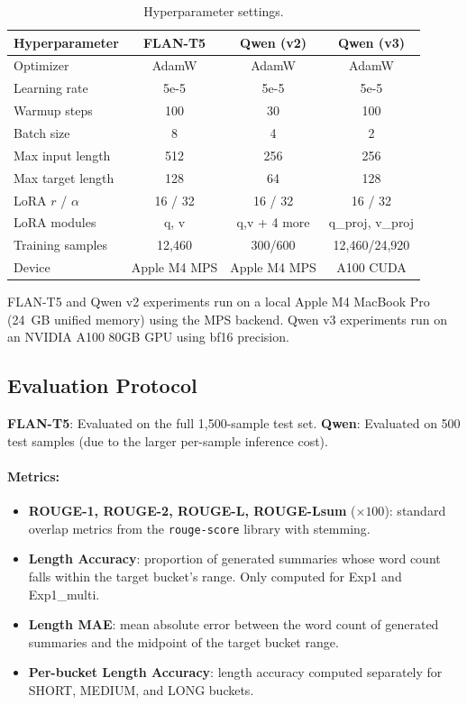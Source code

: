 \documentclass[11pt,a4paper]{article}
\begin{document}
\begin{table}[t]
\centering
\caption{Hyperparameter settings.}
\label{tab:hyperparams}
\small
\begin{tabular}{@{}lccc@{}}
\toprule
\textbf{Hyperparameter} & \textbf{FLAN-T5} & \textbf{Qwen (v2)} & \textbf{Qwen (v3)} \\
\midrule
Optimizer        & AdamW & AdamW & AdamW \\
Learning rate    & 5e-5  & 5e-5  & 5e-5  \\
Warmup steps     & 100   & 30    & 100   \\
Batch size       & 8     & 4     & 2     \\
Max input length & 512   & 256   & 256   \\
Max target length& 128   & 64    & 128   \\
LoRA $r$ / $\alpha$ & 16 / 32 & 16 / 32 & 16 / 32 \\
LoRA modules     & q, v  & q,v + 4 more & q\_proj, v\_proj \\
Training samples & 12,460 & 300/600 & 12,460/24,920 \\
Device           & Apple M4 MPS & Apple M4 MPS & A100 CUDA \\
\bottomrule
\end{tabular}
\end{table}

FLAN-T5 and Qwen v2 experiments run on a local Apple M4 MacBook Pro (24~GB unified memory) using the MPS backend.
Qwen v3 experiments run on an NVIDIA A100 80GB GPU using bf16 precision.

\subsection{Evaluation Protocol}

\textbf{FLAN-T5}: Evaluated on the full 1,500-sample test set.
\textbf{Qwen}: Evaluated on 500 test samples (due to the larger per-sample inference cost).

\paragraph{Metrics:}
\begin{itemize}[nosep]
  \item \textbf{ROUGE-1, ROUGE-2, ROUGE-L, ROUGE-Lsum} ($\times 100$): standard overlap metrics from the \texttt{rouge-score} library with stemming.
  \item \textbf{Length Accuracy}: proportion of generated summaries whose word count falls within the target bucket's range. Only computed for Exp1 and Exp1\_multi.
  \item \textbf{Length MAE}: mean absolute error between the word count of generated summaries and the midpoint of the target bucket range.
  \item \textbf{Per-bucket Length Accuracy}: length accuracy computed separately for SHORT, MEDIUM, and LONG buckets.
\end{itemize}
\end{document}
